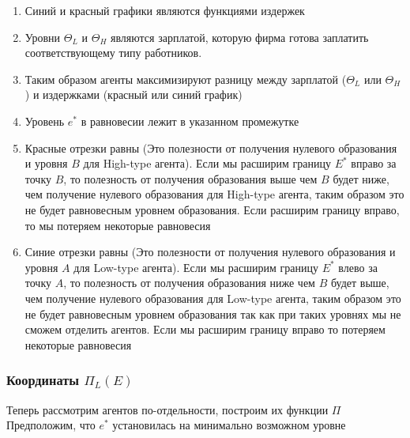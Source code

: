 \begin{enumerate}
    \item Синий и красный графики являются функциями издержек
    \item Уровни $\Theta_L$ и $\Theta_H$ являются зарплатой, которую фирма готова заплатить соответствующему типу работников.
    \item Таким образом агенты максимизируют разницу между зарплатой ($\Theta_L$ или $\Theta_H$) и издержками (красный или синий график)
    \item Уровень $e^*$ в равновесии лежит в указанном промежутке
    \item Красные отрезки равны (Это полезности от получения нулевого образования и уровня $B$ для High-type агента).
    Если мы расширим границу $E^*$ вправо за точку $B$, то полезность от получения образования выше чем $B$ будет ниже, чем получение
    нулевого образования для High-type агента, таким образом это не будет равновесным уровнем образования. Если расширим границу вправо,
    то мы потеряем некоторые равновесия
    \item Синие отрезки равны (Это полезности от получения нулевого образования и уровня $A$ для Low-type агента). Если
    мы расширим границу $E^*$ влево за точку $A$, то полезность от получения образования ниже чем $B$ будет выше, чем
    получение нулевого образования для Low-type агента, таким образом это не будет равновесным уровнем образования так
    как при таких уровнях мы не сможем отделить агентов. Если мы расширим границу вправо то потеряем некоторые
    равновесия
\end{enumerate}

\subsubsection{Координаты $\Pi_L(E)$}

\indent\setlength{\parindent}{1em}Теперь рассмотрим агентов по-отдельности, построим их функции $\Pi$\\

\indent\setlength{\parindent}{1em}Предположим, что $e^*$ установилась на минимально возможном уровне

